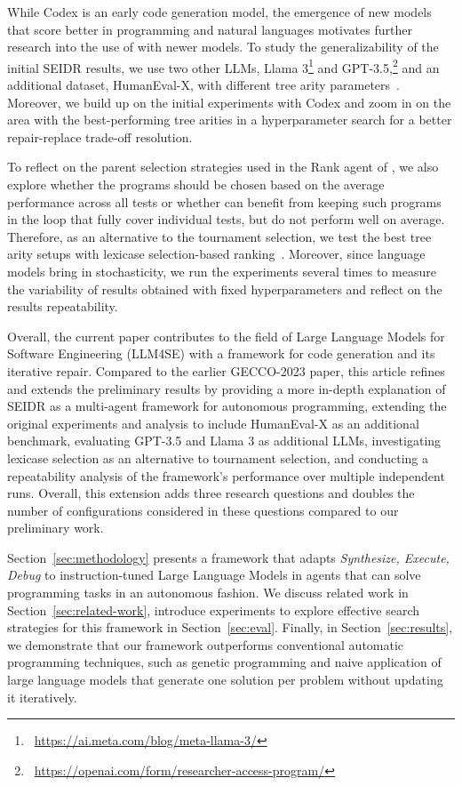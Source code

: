 While Codex is an early code generation model, the emergence of new models that score better in programming and natural languages motivates further research into the use of \method{} with newer models. 
To study the generalizability of the initial SEIDR results, we use two other LLMs, Llama 3\footnote{~\url{https://ai.meta.com/blog/meta-llama-3/}} and GPT-3.5,\footnote{~\url{https://openai.com/form/researcher-access-program/}} and an additional dataset, HumanEval-X, with different tree arity parameters~\cite{brown2020:language, chen2021:evaluating, zheng2023:codegeex}. 
Moreover, we build up on the initial experiments with Codex and zoom in on the area with the best-performing tree arities in a hyperparameter search for a better repair-replace trade-off resolution. 

To reflect on the parent selection strategies used in the Rank agent of \method{}, we also explore whether the programs should be chosen based on the average performance across all tests or whether \method{} can benefit from keeping such programs in the loop that fully cover individual tests, but do not perform well on average.
Therefore, as an alternative to the tournament selection, we test the best tree arity setups with lexicase selection-based ranking~\cite{helmuth2015:solving}.
Moreover, since language models bring in stochasticity, we run the experiments several times to measure the variability of results obtained with fixed hyperparameters and reflect on the results repeatability.

Overall, the current paper contributes to the field of Large Language Models for Software Engineering (LLM4SE) with a framework for code generation and its iterative repair. 
Compared to the earlier GECCO-2023 paper, this article refines and extends the preliminary results by providing a more in-depth explanation of SEIDR as a multi-agent framework for autonomous programming, extending the original experiments and analysis to include HumanEval-X as an additional benchmark, evaluating GPT-3.5 and Llama 3 as additional LLMs, investigating lexicase selection as an alternative to tournament selection, and conducting a repeatability analysis of the framework’s performance over multiple independent runs. Overall, this extension adds three research questions and doubles the number of configurations considered in these questions compared to our preliminary work. 

Section~\ref{sec:methodology} presents a framework that adapts \emph{Synthesize, Execute, Debug} to instruction-tuned Large Language Models in agents that can solve programming tasks in an autonomous fashion. 
We discuss related work in Section~\ref{sec:related-work}, introduce experiments to explore effective search 
strategies for this framework in Section~\ref{sec:eval}. 
Finally, in Section~\ref{sec:results}, we demonstrate that our framework outperforms conventional automatic programming techniques, such as genetic programming and naive application of large language models that generate one solution per problem without updating it iteratively. 

